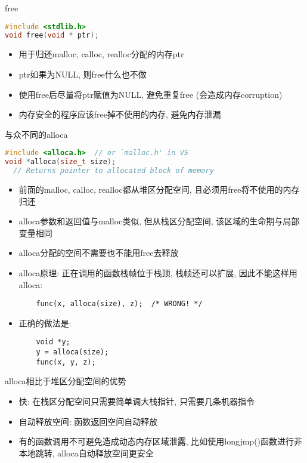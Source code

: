 \begin{frame}[fragile]{free}
    \scriptsize\begin{lstlisting}[language=c]
#include <stdlib.h>
void free(void * ptr);
    \end{lstlisting}
    \normalsize
    \begin{itemize}[<+- | alert@+>]
        \item 用于归还malloc, calloc, realloc分配的内存ptr
        \item ptr如果为NULL, 则free什么也不做
        \item 使用free后尽量将ptr赋值为NULL, 避免重复free (会造成内存corruption)
        \item 内存安全的程序应该free掉不使用的内存, 避免内存泄漏
    \end{itemize}
\end{frame}

\begin{frame}[fragile]{与众不同的alloca}
    \scriptsize\begin{lstlisting}[language=c]
#include <alloca.h>  // or `malloc.h' in VS
void *alloca(size_t size);
  // Returns pointer to allocated block of memory
    \end{lstlisting}
    \normalsize
    \begin{itemize}[<+- | alert@+>]
        \item 前面的malloc, calloc, realloc都从堆区分配空间, 且必须用free将不使用的内存归还
        \item alloca参数和返回值与malloc类似, 但从栈区分配空间, 该区域的生命期与局部变量相同
        \item alloca分配的空间不需要也不能用free去释放
        \item alloca原理: 正在调用的函数栈帧位于栈顶, 栈帧还可以扩展, 因此不能这样用alloca:
        \scriptsize\begin{verbatim}
    func(x, alloca(size), z);  /* WRONG! */
        \end{verbatim}
        \item 正确的做法是:
        \scriptsize\begin{verbatim}
    void *y;
    y = alloca(size);
    func(x, y, z);
        \end{verbatim}
    \end{itemize}
\end{frame}

\begin{frame}[fragile]{alloca相比于堆区分配空间的优势}
    \begin{itemize}[<+- | alert@+>]
        \item 快: 在栈区分配空间只需要简单调大栈指针, 只需要几条机器指令
        \item 自动释放空间: 函数返回空间自动释放
        \item 有的函数调用不可避免造成动态内存区域泄露, 比如使用longjmp()函数进行非本地跳转, alloca自动释放空间更安全
    \end{itemize}
\end{frame}

